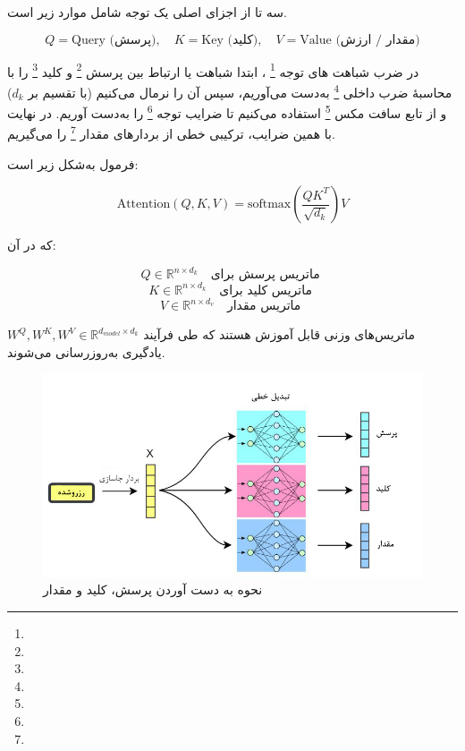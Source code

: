 سه تا از اجزای اصلی یک توجه شامل موارد زیر است.

\[
Q = \text{Query (پرسش)}, \quad K = \text{Key (کلید)}, \quad V = \text{Value (مقدار / ارزش)}
\]





در  ضرب شباهت های توجه \footnote{}    \cite{vaswani2017attention}، ابتدا شباهت یا ارتباط بین پرسش \footnote{} و کلید \footnote{} را با محاسبهٔ ضرب داخلی \footnote{} به‌دست می‌آوریم، سپس آن را نرمال می‌کنیم (با تقسیم بر \( d_k \)) و از تابع سافت مکس \footnote{} استفاده می‌کنیم تا ضرایب توجه \footnote{} را به‌دست آوریم. در نهایت با همین ضرایب، ترکیبی خطی از بردارهای مقدار \footnote{} را می‌گیریم.

فرمول به‌شکل زیر است:

\begin{equation}
	\text{Attention}(Q, K, V) = \text{softmax}\left( \frac{QK^T}{\sqrt{d_k}} \right) V
	\label{eq:attention}
\end{equation}

که در آن:

\[
Q \in \mathbb{R}^{n \times d_k} \quad \text{ماتریس پرسش برای }
\]
\[
K \in \mathbb{R}^{n \times d_k} \quad \text{ماتریس کلید برای }
\]
\[
V \in \mathbb{R}^{n \times d_v} \quad \text{ماتریس مقدار  }
\]



	 \( W^Q, W^K, W^V \in \mathbb{R}^{d_{model} \times d_k} \) ماتریس‌های وزنی قابل آموزش هستند که طی فرآیند یادگیری به‌روزرسانی می‌شوند.
	 
\begin{figure}[h]
	\centering
	\begin{minipage}[b]{0.7\textwidth}
		\centering
		\includegraphics[width=\textwidth]{transformer_images/persian images/persian_images/b19.png}
		\caption{نحوه به دست آوردن پرسش، کلید و مقدار}
		\label{fig:qkv}
	\end{minipage}
	\hfill
\end{figure}


